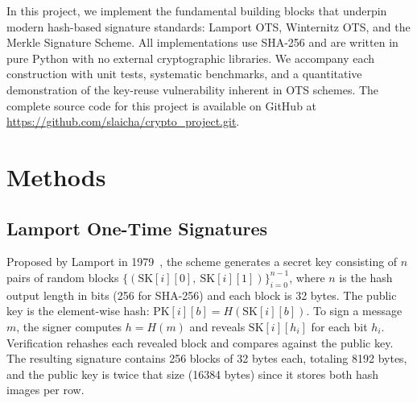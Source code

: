 \documentclass[10pt,a4paper,twocolumn]{article}
\begin{document}
In this project, we implement the fundamental building blocks that underpin modern hash-based signature standards: Lamport OTS, Winternitz OTS, and the Merkle Signature Scheme. All implementations use SHA-256 and are written in pure Python with no external cryptographic libraries. We accompany each construction with unit tests, systematic benchmarks, and a quantitative demonstration of the key-reuse vulnerability inherent in OTS schemes. The complete source code for this project is available on GitHub at \url{https://github.com/slaicha/crypto_project.git}.

\section{Methods}

\subsection{Lamport One-Time Signatures}
Proposed by Lamport in 1979~\cite{lamport1979}, the scheme generates a secret key consisting of $n$ pairs of random blocks $\{(\text{SK}[i][0],\ \text{SK}[i][1])\}_{i=0}^{n-1}$, where $n$ is the hash output length in bits (256 for SHA-256) and each block is 32 bytes. The public key is the element-wise hash: $\text{PK}[i][b] = H(\text{SK}[i][b])$. To sign a message $m$, the signer computes $h = H(m)$ and reveals $\text{SK}[i][h_i]$ for each bit $h_i$. Verification rehashes each revealed block and compares against the public key. The resulting signature contains 256 blocks of 32 bytes each, totaling 8192 bytes, and the public key is twice that size (16384 bytes) since it stores both hash images per row.
\end{document}
